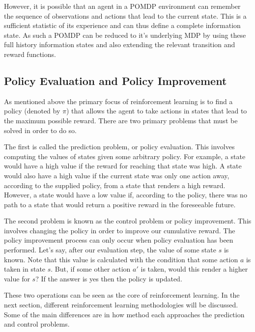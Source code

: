 However, it is possible that an agent in a POMDP environment can remember the sequence of observations
and actions that lead to the current state.
This is a sufficient statistic of its experience and can thus define a complete information
state\citep{heinrich2017reinforcement}.
As such a POMDP can be reduced to it's underlying MDP by using these full history information
states and also extending the relevant transition and reward functions.


\subsection{Policy Evaluation and Policy Improvement}\label{subsec:policyEvalPolicyImp}
As mentioned above the primary focus of reinforcement learning is to find a policy (denoted by $\pi$) that allows
the agent to take actions in states that lead to the maximum possible reward.
There are two primary problems that must be solved in order to do so.

The first is called the prediction problem, or policy evaluation.
This involves computing the values of states given some arbitrary policy\citep{sutton1998reinforcement}.
For example, a state would have a high value if the reward for reaching that state was high.
A state would also have a high value if the current state was only one action away,
according to the supplied policy, from a state that renders a high reward.
However, a state would have a low value if, according to the policy, there was no path to a state that
would return a positive reward in the foreseeable future.

The second problem is known as the control problem or policy improvement.
This involves changing the policy in order to improve our cumulative reward.
The policy improvement process can only occur when policy evaluation has been performed.
Let's say, after our evaluation step, the value of some state $s$ is known.
Note that this value is calculated with the condition that some action $a$ is taken in state $s$.
But, if some other action $a'$ is taken, would this render a higher value for $s$?
If the answer is yes then the policy is updated.

These two operations can be seen as the core of reinforcement learning.
In the next section, different reinforcement learning methodologies will be discussed.
Some of the main differences are in how method each approaches the prediction and control problems.


